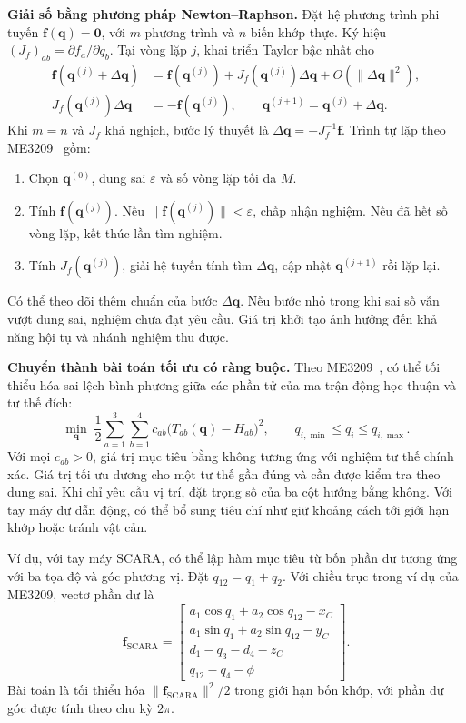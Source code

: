 \medskip
\noindent\textbf{Giải số bằng phương pháp Newton--Raphson.}
Đặt hệ phương trình phi tuyến \(\mathbf f(\mathbf q)=\mathbf 0\), với \(m\) phương trình và \(n\) biến khớp thực. Ký hiệu \((J_f)_{ab}=\partial f_a/\partial q_b\). Tại vòng lặp \(j\), khai triển Taylor bậc nhất cho
\begin{align*}
 \mathbf f(\mathbf q^{(j)}+\Delta\mathbf q)
 &= \mathbf f(\mathbf q^{(j)})+J_f(\mathbf q^{(j)})\Delta\mathbf q
    + O(\|\Delta\mathbf q\|^2),\\
 J_f(\mathbf q^{(j)})\Delta\mathbf q &=-\mathbf f(\mathbf q^{(j)}),\qquad
 \mathbf q^{(j+1)}=\mathbf q^{(j)}+\Delta\mathbf q .
\end{align*}
Khi \(m=n\) và \(J_f\) khả nghịch, bước lý thuyết là \(\Delta\mathbf q=-J_f^{-1}\mathbf f\). Trình tự lặp theo ME3209~\cite[mục 3.2.3, tr.~71--72]{me3209} gồm:
\begin{enumerate}
  \item Chọn \(\mathbf q^{(0)}\), dung sai \(\varepsilon\) và số vòng lặp tối đa \(M\).
  \item Tính \(\mathbf f(\mathbf q^{(j)})\). Nếu \(\|\mathbf f(\mathbf q^{(j)})\|<\varepsilon\), chấp nhận nghiệm. Nếu đã hết số vòng lặp, kết thúc lần tìm nghiệm.
  \item Tính \(J_f(\mathbf q^{(j)})\), giải hệ tuyến tính tìm \(\Delta\mathbf q\), cập nhật \(\mathbf q^{(j+1)}\) rồi lặp lại.
\end{enumerate}
Có thể theo dõi thêm chuẩn của bước \(\Delta\mathbf q\). Nếu bước nhỏ trong khi sai số vẫn vượt dung sai, nghiệm chưa đạt yêu cầu. Giá trị khởi tạo ảnh hưởng đến khả năng hội tụ và nhánh nghiệm thu được.

\medskip
\noindent\textbf{Chuyển thành bài toán tối ưu có ràng buộc.}
Theo ME3209~\cite[mục 3.2.4, tr.~72--73]{me3209}, có thể tối thiểu hóa sai lệch bình phương giữa các phần tử của ma trận động học thuận và tư thế đích:
\[
 \min_{\mathbf q}\;
 \frac12\sum_{a=1}^{3}\sum_{b=1}^{4}c_{ab}\bigl(T_{ab}(\mathbf q)-H_{ab}\bigr)^2,
 \qquad q_{i,\min}\le q_i\le q_{i,\max}.
\]
Với mọi \(c_{ab}>0\), giá trị mục tiêu bằng không tương ứng với nghiệm tư thế chính xác. Giá trị tối ưu dương cho một tư thế gần đúng và cần được kiểm tra theo dung sai. Khi chỉ yêu cầu vị trí, đặt trọng số của ba cột hướng bằng không. Với tay máy dư dẫn động, có thể bổ sung tiêu chí như giữ khoảng cách tới giới hạn khớp hoặc tránh vật cản.

Ví dụ, với tay máy SCARA, có thể lập hàm mục tiêu từ bốn phần dư tương ứng với ba tọa độ và góc phương vị. Đặt \(q_{12}=q_1+q_2\). Với chiều trục trong ví dụ của ME3209, vectơ phần dư là
\[
 \mathbf f_{\mathrm{SCARA}}=
 \begin{bmatrix}
 a_1\cos q_1+a_2\cos q_{12}-x_C\\
 a_1\sin q_1+a_2\sin q_{12}-y_C\\
 d_1-q_3-d_4-z_C\\
 q_{12}-q_4-\phi
 \end{bmatrix}.
\]
Bài toán là tối thiểu hóa \(\|\mathbf f_{\mathrm{SCARA}}\|^2/2\) trong giới hạn bốn khớp, với phần dư góc được tính theo chu kỳ \(2\pi\).

